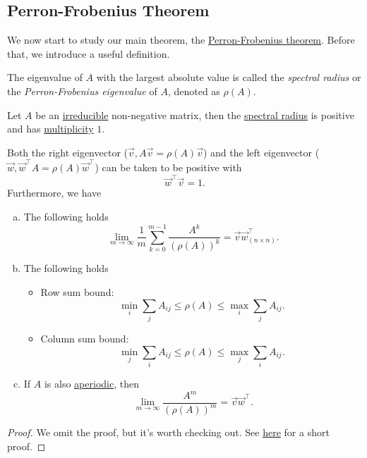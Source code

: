 \subsection{Perron-Frobenius Theorem}
We now start to study our main theorem, the \hyperref[thm:Perron-Frobenius-theorem]{Perron-Frobenius theorem}. Before that, we introduce a useful definition.

\begin{definition}\label{def:spectral-radius}
	The eigenvalue of \(A\) with the largest absolute value is called the \emph{spectral radius} or the \emph{Perron-Frobenius eigenvalue} of \(A\), denoted as \(\rho(A)\).
\end{definition}

\begin{theorem}\label{thm:Perron-Frobenius-theorem}
	Let \(A\) be an \hyperref[def:irreducible]{irreducible} non-negative matrix, then the \hyperref[def:spectral-radius]{spectral radius} is positive
	and has \hyperref[def:multiplicity]{multiplicity} \(1\).

	Both the right eigenvector (\(\vec{v}, A \vec{v} = \rho(A) \vec{v}\)) and the left eigenvector (\(\vec{w}, \vec{w}^{\top}A = \rho(A) \vec{w}^{\top}\))
	can be taken to be positive with
	\[
		\vec{w}^{\top} \vec{v} = 1.
	\]
	Furthermore, we have
	\begin{enumerate}[(a)]
		\item The following holds
		      \[
			      \lim_{m \to \infty} \frac{1}{m} \sum\limits_{k=0}^{m-1} \frac{A^k}{(\rho(A))^k} = \vec{v} \vec{w}^{\top}_{(n\times n)}.
		      \]
		\item The following holds
		      \begin{itemize}
			      \item Row sum bound:
			            \[
				            \min_i \sum\limits_{j} A_{ij} \leq \rho(A) \leq \max_i \sum\limits_{j} A_{ij}.
			            \]
			      \item Column sum bound:
			            \[
				            \min_j \sum\limits_{i} A_{ij} \leq \rho(A) \leq \max_j \sum\limits_{i} A_{ij}.
			            \]
		      \end{itemize}
		\item If \(A\) is also \hyperref[def:aperiodic]{aperiodic}, then
		      \[
			      \lim_{m \to \infty} \frac{A^m}{(\rho(A))^m} = \vec{v} \vec{w}^{\top}.
		      \]
	\end{enumerate}
\end{theorem}
\begin{proof}
	We omit the proof, but it's worth checking out. See \href{https://pi.math.cornell.edu/~web6720/Perron-Frobenius_Hannah%20Cairns.pdf}{here} for a short proof.
\end{proof}

